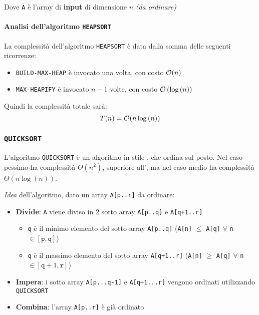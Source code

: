 \documentclass[italian, 10pt]{article}
\begin{document}
Dove \texttt{A} è l'array di \textbf{input} di dimensione \(n\) \textit{(da ordinare)}

\paragraph{Analisi dell'algoritmo \texttt{HEAPSORT}}

La complessità dell'algoritmo \texttt{HEAPSORT} è data dalla somma delle seguenti ricorrenze:

\begin{itemize}
  \item \texttt{BUILD-MAX-HEAP} è invocato una volta, con costo \(\mathcal{O}(n)\)
  \item \texttt{MAX-HEAPIFY} è invocato \(n-1\) volte, con costo \(\mathcal{O}\left(\log{(n)}\right)\)
\end{itemize}

Quindi la complessità totale sarà:
\[ T(n) = \mathcal{O} (n \log{(n)}) \]

\subsubsection{\texttt{QUICKSORT}}

L'algoritmo \texttt{QUICKSORT} è un algoritmo in stile \textit{}, che ordina sul posto.
Nel caso pessimo ha complessità \(\Theta(n^2)\), superiore all', ma nel caso medio ha complessità \(\Theta\left(n \log{(n)}\right)\).

\textit{Idea} dell'algoritmo, dato un array \texttt{A[p..r]} da ordinare:

\begin{itemize}
  \item \textbf{Divide}: \texttt{A} viene diviso in \(2\) sotto array \texttt{A[p..q]} e \texttt{A[q+1..r]}
        \begin{itemize}
          \item \texttt{q} è il minimo elemento del sotto array \texttt{A[p..q]} (\texttt{A[n]} \(\leq\) \texttt{A[q]} \(\forall\) \texttt{n} \(\in [\texttt{p}, \texttt{q}]\))
          \item \texttt{q} è il massimo elemento del sotto array \texttt{A[q+1..r]} (\texttt{A[n]} \(\geq\) \texttt{A[q]} \(\forall\) \texttt{n} \(\in [\texttt{q}+1, \texttt{r}]\))
        \end{itemize}
  \item \textbf{Impera}: i sotto array \texttt{A[p...q-1]} e \texttt{A[q+1...r]} vengono ordinati utilizzando \texttt{QUICKSORT}
  \item \textbf{Combina}: l'array \texttt{A[p..r]} è già ordinato
\end{itemize}
\end{document}
